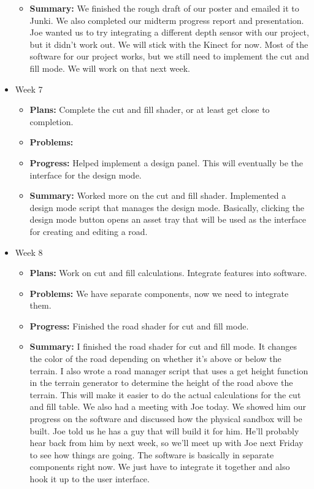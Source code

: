 \documentclass[onecolumn, draftclsnofoot,10pt, compsoc]{IEEEtran}
\begin{document}
\begin{itemize}
\begin{itemize}
    \item \textbf{Summary:} We finished the rough draft of our poster and emailed it to Junki. We also completed our midterm progress report and presentation. Joe wanted us to try integrating a different depth sensor with our project, but it didn't work out. We will stick with the Kinect for now. Most of the software for our project works, but we still need to implement the cut and fill mode. We will work on that next week.
	\end{itemize}
\item Week 7
	\begin{itemize}
	\item \textbf{Plans:} Complete the cut and fill shader, or at least get close to completion.
    \item \textbf{Problems:} 
    \item \textbf{Progress:} Helped implement a design panel. This will eventually be the interface for the design mode.
    \item \textbf{Summary:} Worked more on the cut and fill shader. Implemented a design mode script that manages the design mode. Basically, clicking the design mode button opens an asset tray that will be used as the interface for creating and editing a road.
	\end{itemize}
\item Week 8
	\begin{itemize}
	\item \textbf{Plans:} Work on cut and fill calculations. Integrate features into software.
    \item \textbf{Problems:} We have separate components, now we need to integrate them.
    \item \textbf{Progress:} Finished the road shader for cut and fill mode.
    \item \textbf{Summary:} I finished the road shader for cut and fill mode. It changes the color of the road depending on whether it's above or below the terrain. I also wrote a road manager script that uses a get height function in the terrain generator to determine the height of the road above the terrain. This will make it easier to do the actual calculations for the cut and fill table. We also had a meeting with Joe today. We showed him our progress on the software and discussed how the physical sandbox will be built. Joe told us he has a guy that will build it for him. He'll probably hear back from him by next week, so we'll meet up with Joe next Friday to see how things are going. The software is basically in separate components right now. We just have to integrate it together and also hook it up to the user interface.

\end{itemize}
\end{itemize}
\end{document}
